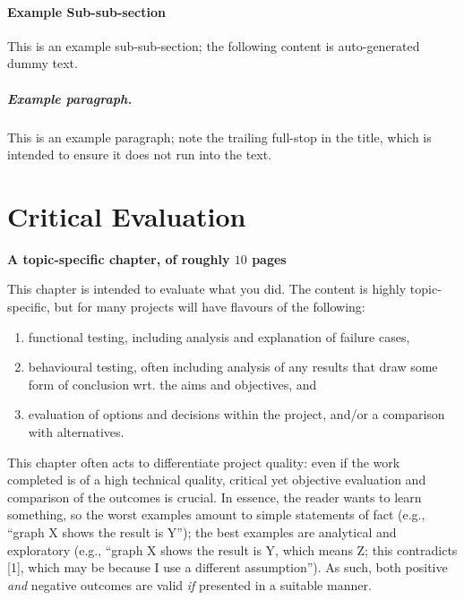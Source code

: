 \documentclass[ %
                    author={Jonathan Rankin},
                supervisor={Dr. David May, Dr. Ian Holyer},
                    degree={MEng},
                     title={CodeTouch},
                  subtitle={A Revolutionary Way To Program Real Code On Touch Screen Devices},
                      type={enterprise},
                      year={2015 } ]{dissertation}
\begin{document}
\subsubsection{Example Sub-sub-section}

This is an example sub-sub-section;
the following content is auto-generated dummy text.
\lipsum

\paragraph{Example paragraph.}

This is an example paragraph; note the trailing full-stop in the title,
which is intended to ensure it does not run into the text.


\chapter{Critical Evaluation}
\label{chap:evaluation}

{\bf A topic-specific chapter, of roughly $10$ pages} 
\vspace{1cm} 

\noindent
This chapter is intended to evaluate what you did.  The content is highly 
topic-specific, but for many projects will have flavours of the following:

\begin{enumerate}
\item functional  testing, including analysis and explanation of failure 
      cases,
\item behavioural testing, often including analysis of any results that 
      draw some form of conclusion wrt. the aims and objectives,
      and
\item evaluation of options and decisions within the project, and/or a
      comparison with alternatives.
\end{enumerate}

\noindent
This chapter often acts to differentiate project quality: even if the work
completed is of a high technical quality, critical yet objective evaluation 
and comparison of the outcomes is crucial.  In essence, the reader wants to
learn something, so the worst examples amount to simple statements of fact 
(e.g., ``graph X shows the result is Y''); the best examples are analytical 
and exploratory (e.g., ``graph X shows the result is Y, which means Z; this 
contradicts [1], which may be because I use a different assumption'').  As 
such, both positive {\em and} negative outcomes are valid {\em if} presented 
in a suitable manner.
\end{document}
